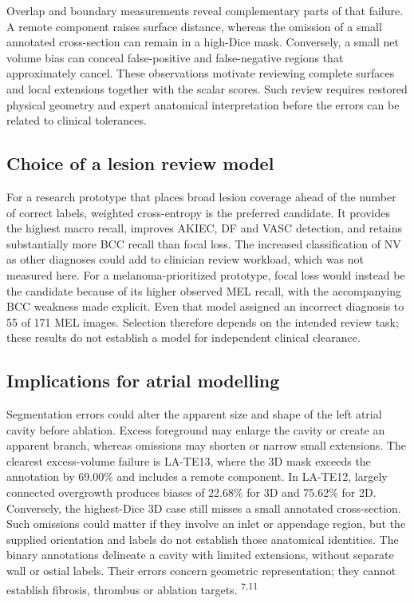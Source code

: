\documentclass[11pt,a4paper]{article}
\begin{document}
Overlap and boundary measurements reveal complementary parts of that failure. A remote component raises surface distance, whereas the omission of a small annotated cross-section can remain in a high-Dice mask. Conversely, a small net volume bias can conceal false-positive and false-negative regions that approximately cancel. These observations motivate reviewing complete surfaces and local extensions together with the scalar scores. Such review requires restored physical geometry and expert anatomical interpretation before the errors can be related to clinical tolerances.



\subsection*{Choice of a lesion review model}

For a research prototype that places broad lesion coverage ahead of the number of correct labels, weighted cross-entropy is the preferred candidate. It provides the highest macro recall, improves AKIEC, DF and VASC detection, and retains substantially more BCC recall than focal loss. The increased classification of NV as other diagnoses could add to clinician review workload, which was not measured here. For a melanoma-prioritized prototype, focal loss would instead be the candidate because of its higher observed MEL recall, with the accompanying BCC weakness made explicit. Even that model assigned an incorrect diagnosis to 55 of 171 MEL images. Selection therefore depends on the intended review task; these results do not establish a model for independent clinical clearance.



\subsection*{Implications for atrial modelling}

Segmentation errors could alter the apparent size and shape of the left atrial cavity before ablation. Excess foreground may enlarge the cavity or create an apparent branch, whereas omissions may shorten or narrow small extensions. The clearest excess-volume failure is LA-TE13, where the 3D mask exceeds the annotation by 69.00\% and includes a remote component. In LA-TE12, largely connected overgrowth produces biases of 22.68\% for 3D and 75.62\% for 2D. Conversely, the highest-Dice 3D case still misses a small annotated cross-section. Such omissions could matter if they involve an inlet or appendage region, but the supplied orientation and labels do not establish those anatomical identities. The binary annotations delineate a cavity with limited extensions, without separate wall or ostial labels. Their errors concern geometric representation; they cannot establish fibrosis, thrombus or ablation targets. \textsuperscript{7,11}
\end{document}
